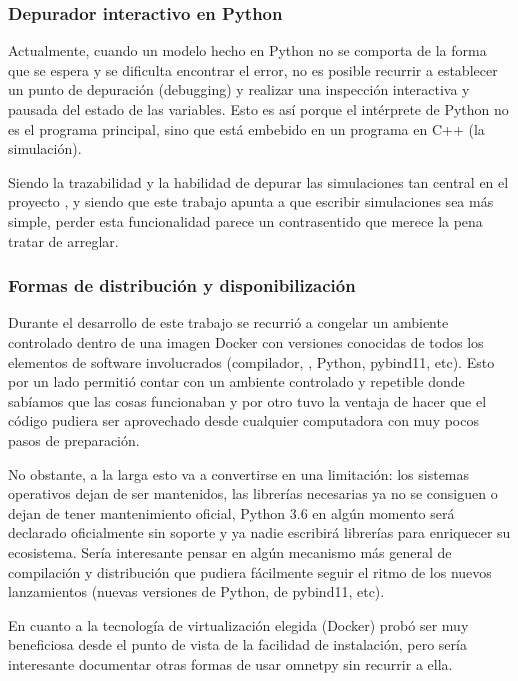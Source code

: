 \documentclass[]{article}
\begin{document}
\subsubsection{Depurador interactivo en Python}

Actualmente, cuando un modelo hecho en Python no se comporta de la forma que se
espera y se dificulta encontrar el error, no es posible recurrir a establecer
un punto de depuración (debugging) y realizar una inspección interactiva y
pausada del estado de las variables. Esto es así porque el intérprete de Python
no es el programa principal, sino que está embebido en un programa en C++ (la
simulación).

Siendo la trazabilidad y la habilidad de depurar las simulaciones tan central
en el proyecto \omnetpp{}, y siendo que este trabajo apunta a que escribir
simulaciones sea más simple, perder esta funcionalidad parece un contrasentido
que merece la pena tratar de arreglar.

\subsubsection{Formas de distribución y disponibilización}

Durante el desarrollo de este trabajo se recurrió a congelar un ambiente
controlado dentro de una imagen Docker con versiones conocidas de todos los
elementos de software involucrados (compilador, \omnetpp{}, Python, pybind11,
etc). Esto por un lado permitió contar con un ambiente controlado y repetible
donde sabíamos que las cosas funcionaban y por otro tuvo la ventaja de hacer
que el código pudiera ser aprovechado desde cualquier computadora con muy pocos
pasos de preparación.

No obstante, a la larga esto va a convertirse en una limitación: los sistemas
operativos dejan de ser mantenidos, las librerías necesarias ya no se consiguen
o dejan de tener mantenimiento oficial, Python 3.6 en algún momento será
declarado oficialmente sin soporte y ya nadie escribirá librerías para
enriquecer su ecosistema. Sería interesante pensar en algún mecanismo más
general de compilación y distribución que pudiera fácilmente seguir el ritmo de
los nuevos lanzamientos (nuevas versiones de Python, de pybind11, etc).

En cuanto a la tecnología de virtualización elegida (Docker) probó ser muy
beneficiosa desde el punto de vista de la facilidad de instalación, pero sería
interesante documentar otras formas de usar omnetpy sin recurrir a ella.
\end{document}
